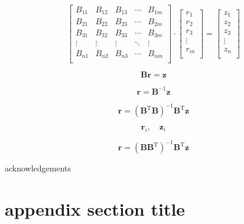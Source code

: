 \documentclass[amsmath,
               amssymb,
               superscriptaddress,
               aps,
               floats,
               showkeys,
               notitlepage, %
               ]{revtex4-1}
\begin{document}
$$
\begin{bmatrix}
B_{11} & B_{12} & B_{13} & \cdots & B_{1m}\\
B_{21} & B_{22} & B_{23} & \cdots & B_{2m}\\
B_{31} & B_{32} & B_{33} & \cdots & B_{3m}\\
\vdots & \vdots & \vdots & \ddots & \vdots \\
B_{n1} & B_{n2} & B_{n3} & \cdots & B_{nm}\\
\end{bmatrix}
\cdot
\begin{bmatrix}
r_{1} \\
r_{2} \\
r_{3} \\
\vdots \\
r_{m} \\
\end{bmatrix}
=
\begin{bmatrix}
z_{1} \\
z_{2} \\
z_{3} \\
\vdots \\
z_{n} \\
\end{bmatrix}
$$

$$
\mathbf{B}\mathbf{r}=\mathbf{z}
$$

$$
\mathbf{r}=\mathbf{B}^{-1}\mathbf{z}
$$

$$
\mathbf{r}=\left(\mathbf{B}^{\textrm{T}}\mathbf{B}\right)^{-1}\mathbf{B}^{\textrm{T}}\mathbf{z}
$$

$$\mathbf{r}_{i},\quad\mathbf{z}_{i}$$

$$\mathbf{r}=\left(\mathbf{B}\mathbf{B}^{\textrm{T}}\right)^{-1}
\mathbf{B}^{\textrm{T}}\mathbf{z}$$



\begin{acknowledgments}
 acknowledgements
\end{acknowledgments}

\appendix
\section{appendix section title}




\end{document}

